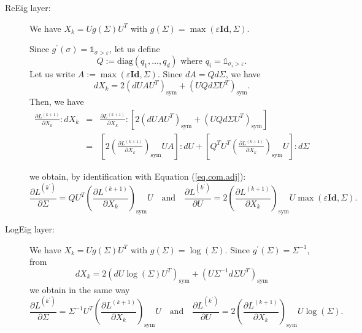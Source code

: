 \documentclass[10pt,a4paper]{book}
\theoremstyle{definition}
\theoremstyle{plain}
\theoremstyle{remark}
\newcommand{\Id}{\mathrm{\textbf{Id}}}
\begin{document}
\begin{description}
    \item[ReEig layer:] We have 
    $X_k=Ug(\Sigma) U^{T}$
    with $g(\Sigma)=\max(\varepsilon \Id,\Sigma)$. 
    
    Since $g^{\prime}(\sigma)=\mathds{1}_{\sigma>\varepsilon}$, let us define
     $$Q:=\text{diag}(q_1,\dots,q_d) \text{ where } q_i=\mathds{1}_{\sigma_i>\varepsilon}.$$
     Let us write $A:=\max(\varepsilon \Id,\Sigma)$. Since $dA=Qd\Sigma$, we have
    $$dX_{k}=2(dUAU^T)_{\text{sym}}+(UQd\Sigma U^{T})_{\text{sym}}.$$
    Then, we have
    \begin{eqnarray*}
    \frac{\partial L^{(k+1)}}{\partial X_k}:dX_k&=&\frac{\partial L^{(k+1)}}{\partial X_k}: \left[2(dU AU^T)_{\text{sym}}+(UQd\Sigma U^{T})_{\text{sym}}\right]\\
    &=&\left[2\left(\frac{\partial L^{(k+1)}}{\partial X_k}\right)_{\text{sym}}U A \right]: dU+ \left[Q^TU^T\left(\frac{\partial L^{(k+1)}}{\partial X_k}\right)_{\text{sym}}U\right]:d\Sigma
    \end{eqnarray*}
    
    we obtain, by identification with Equation (\ref{eq.com.adj}):
    $$\frac{\partial L^{(k^{\prime})}}{\partial \Sigma}=QU^T \left ( \frac{\partial L^{(k+1)}}{\partial X_k} \right )_{\text{sym}} U~~~ \text{ and }~~~
    \frac{\partial L^{(k^{\prime})}}{\partial U}=2\left ( \frac{\partial L^{(k+1)}}{\partial X_k} \right )_{\text{sym}} U \max(\varepsilon \Id, \Sigma).
    $$
    \item[LogEig layer:] We have 
    $X_k=Ug(\Sigma) U^{T}$
    with $g(\Sigma)=\log(\Sigma)$. 
    Since $g^{\prime}(\Sigma)=\Sigma^{-1}$, from
    $$dX_{k}=2(dU\log(\Sigma)U^{T})_{\text{sym}}+(U\Sigma^{-1}d\Sigma U^T)_{\text{sym}}$$
    we obtain in the same way
    $$
    \frac{\partial L^{(k^{\prime})}}{\partial \Sigma}=\Sigma^{-1}U^T \left ( \frac{\partial L^{(k+1)}}{\partial X_k} \right )_{\text{sym}} U~~~ \text{ and }~~~
    \frac{\partial L^{(k^{\prime})}}{\partial U}=2\left ( \frac{\partial L^{(k+1)}}{\partial X_k} \right )_{\text{sym}} U \log(\Sigma).
    $$
\end{description}
\end{document}
